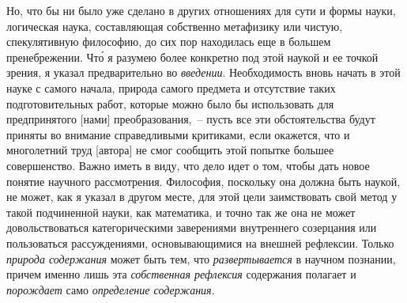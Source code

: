 Но, что бы ни было уже сделано в других отношениях
для сути и формы науки, логическая наука, составляющая
собственно метафизику или чистую, спекулятивную
философию, до сих пор находилась еще в большем
пренебрежении. Чт\'о я разумею более конкретно под этой
наукой и ее точкой зрения, я указал предварительно во
\emph{введении}. Необходимость вновь начать в этой науке с
самого начала, природа самого предмета и отсутствие таких
подготовительных работ, которые можно было бы
использовать для предпринятого [нами] преобразования,~--
пусть все эти обстоятельства будут приняты во внимание
справедливыми критиками, если окажется, что и многолетний
труд [автора] не смог сообщить этой попытке
большее совершенство. Важно иметь в виду, что дело
идет о том, чтобы дать новое понятие научного рассмотрения.
Философия, поскольку она должна быть наукой,
не может, как я указал в другом
месте\footnotemark{},
для этой цели
заимствовать свой метод у такой подчиненной науки, как
математика, и точно так же она не может довольствоваться
категорическими заверениями внутреннего созерцания
или пользоваться рассуждениями, основывающимися
на внешней рефлексии. Только \emph{природа содержания}
может быть тем, что \emph{развертывается} в научном познании,
причем именно лишь эта \emph{собственная рефлексия} содержания
полагает и \emph{порождает} само \emph{определение содержания}\endnotemark{}.




